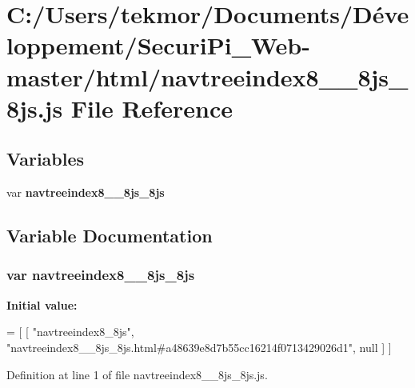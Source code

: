 \section{C\+:/\+Users/tekmor/\+Documents/\+Développement/\+Securi\+Pi\+\_\+\+Web-\/master/html/navtreeindex8\+\_\+\+\_\+8js\+\_\+8js.js File Reference}
\label{navtreeindex8____8js__8js_8js}
\subsection*{Variables}
\begin{DoxyCompactItemize}
\item 
var {\bf navtreeindex8\+\_\+\+\_\+8js\+\_\+8js}
\end{DoxyCompactItemize}


\subsection{Variable Documentation}
\subsubsection[{navtreeindex8\+\_\+\+\_\+8js\+\_\+8js}]{\setlength{\rightskip}{0pt plus 5cm}var navtreeindex8\+\_\+\+\_\+8js\+\_\+8js}\label{navtreeindex8____8js__8js_8js_ad91a7eeae025fed936bbbc13616d63c9}
{\bfseries Initial value\+:}
\begin{DoxyCode}
=
[
    [ \textcolor{stringliteral}{"navtreeindex8\_8js"}, \textcolor{stringliteral}{"navtreeindex8\_\_8js\_8js.html#a48639e8d7b55cc16214f0713429026d1"}, null ]
]
\end{DoxyCode}


Definition at line 1 of file navtreeindex8\+\_\+\+\_\+8js\+\_\+8js.\+js.

